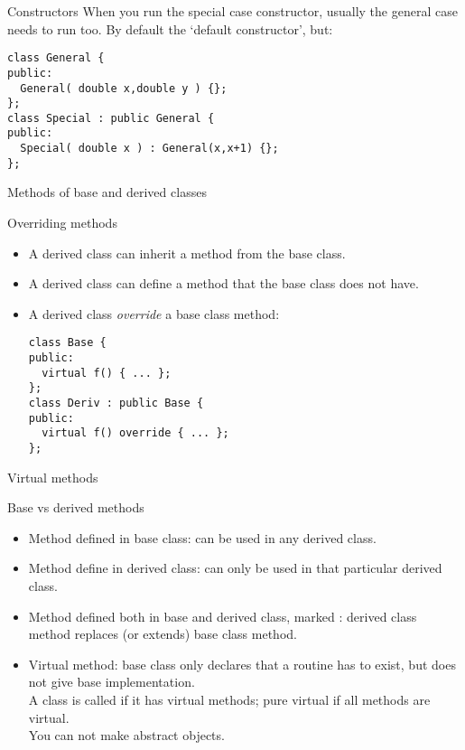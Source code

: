 \begin{slide}{Constructors}
  \label{sl:obj-derive-construct}
  When you run the special case constructor, usually the general case
  needs to run too. By default the `default constructor', but:
\begin{verbatim}
class General {
public:
  General( double x,double y ) {};
};
class Special : public General {
public:
  Special( double x ) : General(x,x+1) {};
};
\end{verbatim}
\end{slide}

 {Methods of base and derived classes}
\label{sec:derive-method}

\begin{block}{Overriding methods}
  \label{sl:obj-method-override}
  \begin{itemize}
  \item A derived class can inherit a method from the base class.
  \item A derived class can define a method that the base class does
    not have.
  \item A derived class \emph{override} a
    base class method:
\begin{verbatim}
class Base {
public:
  virtual f() { ... };
};
class Deriv : public Base {
public:
  virtual f() override { ... };
};
\end{verbatim}
  \end{itemize}
\end{block}

 {Virtual methods}

\begin{block}{Base vs derived methods}
  \begin{itemize}
  \item Method defined in base class: can be used in any derived class.
  \item Method define in derived class: can only be used in that
    particular derived class.
  \item Method defined both in base and derived class, marked
    : derived class method replaces (or extends)
    base class method.
  \item Virtual method: base class only declares that a routine has to
    exist, but does not give base implementation.\\ A class is called
     if it has virtual methods; pure
    virtual if all methods are virtual.\\ You can not make abstract objects.
  \end{itemize}  
\end{block}

